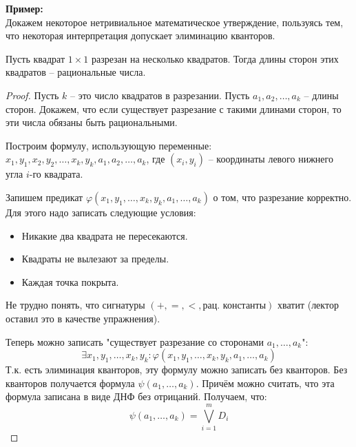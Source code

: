 \textbf{Пример:} \\
Докажем некоторое нетривиальное математическое утверждение, пользуясь тем, что некоторая интерпретация допускает элиминацию кванторов.
\begin{theorem}
    Пусть квадрат $1\times1$ разрезан на несколько квадратов. Тогда длины сторон этих квадратов -- рациональные числа.
\end{theorem}
\begin{proof}
    Пусть $k$ -- это число квадратов в разрезании. Пусть $a_1, a_2, \dots, a_k$ -- длины сторон. Докажем, что если существует разрезание с такими длинами сторон, то эти числа обязаны быть рациональными.

    Построим формулу, использующую переменные: $x_1, y_1, x_2, y_2, \dots, x_k, y_k, a_1, a_2, \dots, a_k$, где $(x_i, y_i)$ -- координаты левого нижнего угла $i$-го квадрата.

    Запишем предикат $\varphi(x_1, y_1, \dots, x_k, y_k, a_1, \dots, a_k)$ о том, что разрезание корректно. Для этого надо записать следующие условия:
    \begin{itemize}
        \item Никакие два квадрата не пересекаются.
        \item Квадраты не вылезают за пределы.
        \item Каждая точка покрыта.
    \end{itemize}
    Не трудно понять, что сигнатуры $(+, =, <, \text{рац. константы})$ хватит (лектор оставил это в качестве упражнения).
    
    Теперь можно записать "существует разрезание со сторонами $a_1, \dots, a_k$":
    $$ \exists x_1, y_1, \dots, x_k, y_k : \varphi(x_1, y_1, \dots, x_k, y_k, a_1, \dots, a_k) $$
    Т.к. есть элиминация кванторов, эту формулу можно записать без кванторов. Без кванторов получается формула $\psi(a_1, \dots, a_k)$. Причём можно считать, что эта формула записана в виде ДНФ без отрицаний. Получаем, что:
    $$\psi(a_1, \dots, a_k) = \bigvee_{i=1}^m D_i$$


\end{proof}
